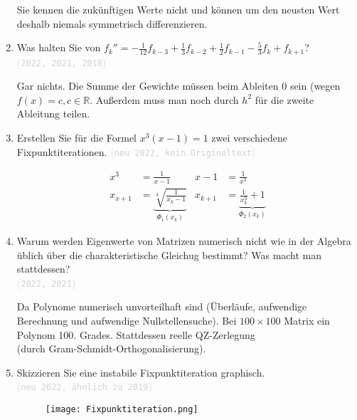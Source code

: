 \documentclass[12pt]{article}
\newcommand{\kommentarMacro}[1]{\textcolor{lightgray}{(\texttt{#1})}}
\begin{document}
\begin{enumerate}
          \begin{solution}
              Sie kennen die zukünftigen Werte nicht und können um den neusten Wert deshalb niemals symmetrisch differenzieren.
          \end{solution}

    \item Was halten Sie von $f_k'' = -\frac{1}{12}f_{k-3}+ \frac{1}{3}f_{k-2} + \frac{1}{2}f_{k-1} - \frac{5}{3}f_k + f_{k+1}$? \\ \kommentarMacro{2022, 2021, 2018}

          \begin{solution}
              Gar nichts. Die Summe der Gewichte müssen beim Ableiten 0 sein (wegen $f(x) = c, c\in \mathbb{R}$. Außerdem muss man noch durch $h^2$ für die zweite Ableitung teilen.
          \end{solution}
          \pagebreak

    \item Erstellen Sie für die Formel $x^3\left(x-1\right)=1$ zwei verschiedene Fixpunktiterationen. \kommentarMacro{neu 2022, kein Originaltext}
          \begin{solution}
              \begin{align*}
                  x^3     & = \frac{1}{x-1}                                       & x-1     & =\frac{1}{x^3}                                \\
                  x_{x+1} & =\underbrace{\sqrt[3]{\frac{1}{x_k-1}}}_{\Phi_1(x_k)} & x_{k+1} & =\underbrace{\frac{1}{x_k^3}+1}_{\Phi_2(x_k)}
              \end{align*}
          \end{solution}
    \item Warum werden Eigenwerte von Matrizen numerisch nicht wie in der Algebra üblich über die charakteristische Gleichug bestimmt? Was macht man stattdessen? \\ \kommentarMacro{2022, 2021}

          \begin{solution}
              Da Polynome numerisch unvorteilhaft sind (Überläufe, aufwendige\\Berechnung und aufwendige Nullstellensuche). Bei $100\times 100$ Matrix ein\\Polynom 100. Grades. Stattdessen reelle QZ-Zerlegung \\(durch Gram-Schmidt-Orthogonalisierung).
          \end{solution}

    \item Skizzieren Sie eine instabile Fixpunktiteration graphisch. \\ \kommentarMacro{neu 2022, ähnlich zu 2019}
          \begin{solution}
              \begin{figure}[!ht]
                  \texttt{[image: Fixpunktiteration.png]}
                  \centering
              \end{figure}
          \end{solution}
\end{enumerate}
\pagebreak
\end{document}
